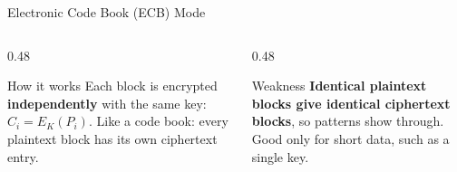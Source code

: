 \documentclass[aspectratio=169,11pt,xcolor={table}]{beamer}
\begin{document}
\begin{frame}{Electronic Code Book (ECB) Mode}
  \centering
  \vspace{3mm}
  \begin{columns}[T]
    \begin{column}{0.48\textwidth}
      \begin{block}{How it works}
        \small Each block is encrypted \textbf{independently} with the same key: $C_i = E_K(P_i)$. Like a code book: every plaintext block has its own ciphertext entry.
      \end{block}
    \end{column}
    \begin{column}{0.48\textwidth}
      \begin{alertblock}{Weakness}
        \small \textbf{Identical plaintext blocks give identical ciphertext blocks}, so patterns show through. Good only for short data, such as a single key.
      \end{alertblock}
    \end{column}
  \end{columns}
\end{frame}
\end{document}
